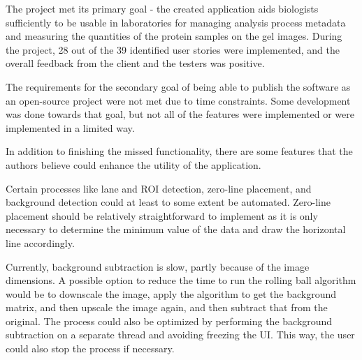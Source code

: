 The project met its primary goal - the created application aids biologists sufficiently to be usable in laboratories for managing analysis process metadata and measuring the quantities of the protein samples on the gel images. During the project, 28 out of the 39 identified user stories were implemented, and the overall feedback from the client and the testers was positive.

The requirements for the secondary goal of being able to publish the software as an open-source project were not met due to time constraints. Some development was done towards that goal, but not all of the features were implemented or were implemented in a limited way.

In addition to finishing the missed functionality, there are some features that the authors believe could enhance the utility of the application.

Certain processes like lane and ROI detection, zero-line placement, and background detection could at least to some extent be automated. Zero-line placement should be relatively straightforward to implement as it is only necessary to determine the minimum value of the data and draw the horizontal line accordingly.

Currently, background subtraction is slow, partly because of the image dimensions. A possible option to reduce the time to run the rolling ball algorithm would be to downscale the image, apply the algorithm to get the background matrix, and then upscale the image again, and then subtract that from the original. The process could also be optimized by performing the background subtraction on a separate thread and avoiding freezing the UI. This way, the user could also stop the process if necessary.
